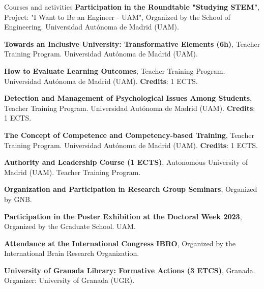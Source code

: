 \begin{rubric}{Courses and activities}
\entry*[June 2022] \textbf{Participation in the Roundtable "Studying STEM"}, Project: "I Want to Be an Engineer - UAM", Organized by the School of Engineering. Universidad Autónoma de Madrid (UAM).


 \entry*[May 9-11, 2022] \textbf{Towards an Inclusive University: Transformative Elements (6h)}, Teacher Training Program. Universidad Autónoma de Madrid (UAM).


 \entry*[February 15-17, 2023] \textbf{How to Evaluate Learning Outcomes}, Teacher Training Program. Universidad Autónoma de Madrid (UAM). \textbf{Credits}: 1 ECTS.

 \entry*[April 20-27, 2023] \textbf{Detection and Management of Psychological Issues Among Students}, Teacher Training Program. Universidad Autónoma de Madrid (UAM). \textbf{Credits}: 1 ECTS.

 \entry*[October 17-24, 2023] \textbf{The Concept of Competence and Competency-based Training}, Teacher Training Program. Universidad Autónoma de Madrid (UAM). \textbf{Credits}: 1 ECTS.

\entry*[February 19-20, 2024] \textbf{Authority and Leadership Course (1 ECTS)}, Autonomous University of Madrid (UAM). Teacher Training Program.

  \textbf{Organization and Participation in Research Group Seminars}, Organized by GNB.

\entry*[June 2023] \textbf{Participation in the Poster Exhibition at the Doctoral Week 2023}, Organized by the Graduate School. UAM.

\entry*[September 2023] \textbf{Attendance at the International Congress IBRO}, Organized by the International Brain Research Organization.

 \textbf{University of Granada Library: Formative Actions (3 ETCS)}, Granada. Organizer: University of Granada (UGR).

\end{rubric}